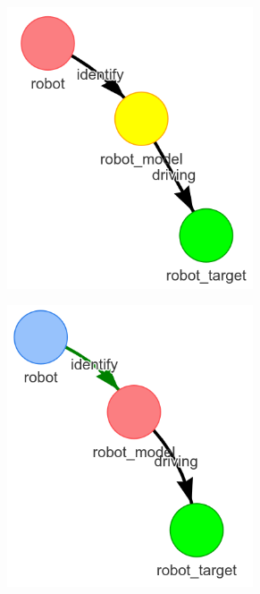 \begin{figure}[H]
    \centering
    \begin{subfigure}{.3\textwidth}
    \centering
    \includegraphics[width=0.8\textwidth]{figures/connecting_nodes/robot_to_target/execute_robot_to_target_1}
    \caption{}%
    \end{subfigure}
    \begin{subfigure}{.3\textwidth}
    \centering
    \includegraphics[width=0.8\textwidth]{figures/connecting_nodes/robot_to_target/execute_robot_to_target_2}

\end{subfigure}
\end{figure}
